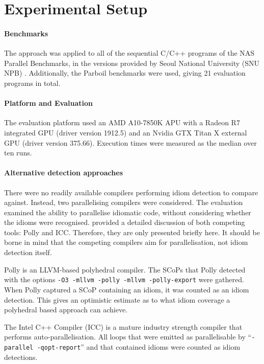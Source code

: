 \section{Experimental Setup}

    \paragraph*{Benchmarks}
    The approach was applied to all of the sequential C/C++ programs of the NAS
    Parallel Benchmarks, in the versions provided by Seoul National University
    (SNU NPB) \citep{seo2011performance}.
    Additionally, the Parboil benchmarks \citep{Stratton2018} were used,
    giving 21 evaluation programs in total. 

    \paragraph*{Platform and Evaluation}
    The evaluation platform used an AMD A10-7850K APU with a Radeon R7
    integrated GPU (driver version 1912.5) and an Nvidia GTX Titan X external
    GPU (driver version 375.66).
    Execution times were measured as the median over ten runs.

    \paragraph*{Alternative detection approaches}
    There were no readily available compilers performing idiom detection to
    compare against.
    Instead, two parallelising compilers were considered.
    The evaluation examined the ability to parallelise idiomatic code, without
    considering whether the idioms were recognised.
     provided a detailed discussion of both
    competing tools: Polly and ICC.
    Therefore, they are only presented briefly here.
    It should be borne in mind that the competing compilers aim for
    parallelisation, not idiom detection itself.

    Polly is an LLVM-based polyhedral compiler.
    The SCoPs that Polly detected with the options
    {\tt -O3 -mllvm -polly -mllvm -polly-export} were gathered.
    When Polly captured a SCoP containing an idiom, it was counted as an
    idiom detection.
    This gives an optimistic estimate as to what idiom coverage a polyhedral
    based approach can achieve.

    The Intel C++ Compiler (ICC) is a mature industry strength compiler that
    performs auto-parallelisation.
    All loops that were emitted as parallelisable by
    ``{\tt-parallel -qopt-report}'' and that contained idioms were counted as
    idiom detections.

